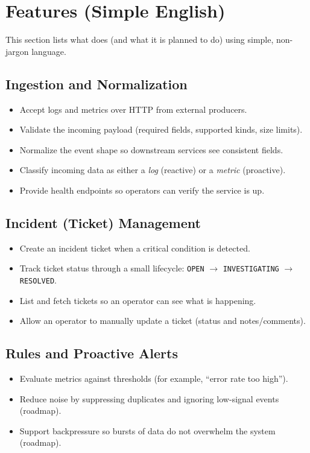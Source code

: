 \section{Features (Simple English)}

This section lists what \watchdog{} does (and what it is planned to do) using simple, non-jargon language.

\subsection{Ingestion and Normalization}
\begin{itemize}
  \item Accept logs and metrics over HTTP from external producers.
  \item Validate the incoming payload (required fields, supported kinds, size limits).
  \item Normalize the event shape so downstream services see consistent fields.
  \item Classify incoming data as either a \emph{log} (reactive) or a \emph{metric} (proactive).
  \item Provide health endpoints so operators can verify the service is up.
\end{itemize}

\subsection{Incident (Ticket) Management}
\begin{itemize}
  \item Create an incident ticket when a critical condition is detected.
  \item Track ticket status through a small lifecycle: \texttt{OPEN} $\rightarrow$ \texttt{INVESTIGATING} $\rightarrow$ \texttt{RESOLVED}.
  \item List and fetch tickets so an operator can see what is happening.
  \item Allow an operator to manually update a ticket (status and notes/comments).
\end{itemize}

\subsection{Rules and Proactive Alerts}
\begin{itemize}
  \item Evaluate metrics against thresholds (for example, ``error rate too high'').
  \item Reduce noise by suppressing duplicates and ignoring low-signal events (roadmap).
  \item Support backpressure so bursts of data do not overwhelm the system (roadmap).
\end{itemize}

